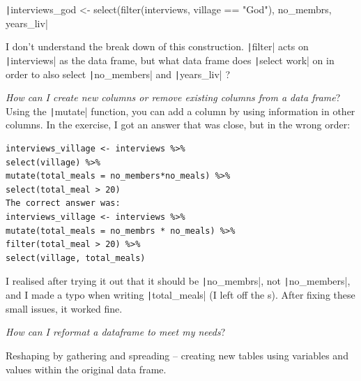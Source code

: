 \documentclass{article}
\begin{document}
\texttt|interviews_god <- select(filter(interviews, village == "God"), no_membrs, years_liv|

I don’t understand the break down of this construction. \texttt|filter| acts on 
\texttt|interviews| as the data frame, but what data frame does \texttt|select work| on in order to also select \texttt|no_members| and \texttt|years_liv| ?

\textit{How can I create new columns or remove existing columns from a data frame}?
Using the \texttt|mutate| function, you can add a column by using information in other columns.
In the exercise, I got an answer that was close, but in the wrong order:

\begin{verbatim}
interviews_village <- interviews %>%
select(village) %>%
mutate(total_meals = no_members*no_meals) %>%
select(total_meal > 20)
The correct answer was:
interviews_village <- interviews %>%
mutate(total_meals = no_membrs * no_meals) %>%
filter(total_meal > 20) %>%
select(village, total_meals)
\end{verbatim}

I realised after trying it out that it should be \texttt|no_membrs|, not \texttt|no_members|, and I made a typo when writing \texttt|total_meals| (I left off the s).
After fixing these small issues, it worked fine.

\textit{How can I reformat a dataframe to meet my needs}?

Reshaping by gathering and spreading – creating new tables using variables and values within the original data frame.
\end{document}

